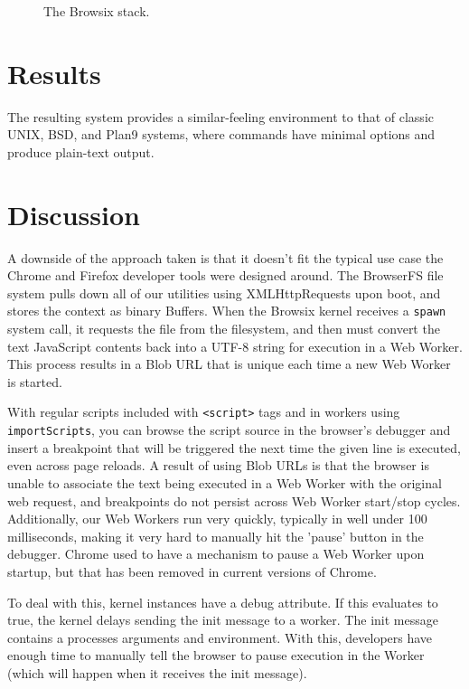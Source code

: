 \documentclass{acm_proc_article-sp}
\begin{document}
\begin{figure}
\centering
{}
\caption{The Browsix stack.}
\end{figure}

\section{Results}

The resulting system provides a similar-feeling environment to that of
classic UNIX, BSD, and Plan9 systems, where commands have minimal
options and produce plain-text output.

\section{Discussion}

A downside of the approach taken is that it doesn't fit the typical
use case the Chrome and Firefox developer tools were designed around.
The BrowserFS file system pulls down all of our utilities using
XMLHttpRequests upon boot, and stores the context as binary Buffers.
When the Browsix kernel receives a \texttt{spawn} system call, it
requests the file from the filesystem, and then must convert the text
JavaScript contents back into a UTF-8 string for execution in a Web
Worker.  This process results in a Blob URL that is unique each time a
new Web Worker is started.

With regular scripts included with \texttt{<script>} tags and in
workers using \texttt{importScripts}, you can browse the script source
in the browser's debugger and insert a breakpoint that will be
triggered the next time the given line is executed, even across page
reloads.  A result of using Blob URLs is that the browser is unable to
associate the text being executed in a Web Worker with the original
web request, and breakpoints do not persist across Web Worker
start/stop cycles.  Additionally, our Web Workers run very quickly,
typically in well under 100 milliseconds, making it very hard to
manually hit the 'pause' button in the debugger.  Chrome used to have
a mechanism to pause a Web Worker upon startup, but that has been
removed in current versions of Chrome.

To deal with this, kernel instances have a debug attribute.  If this
evaluates to true, the kernel delays sending the init message to a
worker.  The init message contains a processes arguments and
environment.  With this, developers have enough time to manually tell
the browser to pause execution in the Worker (which will happen when
it receives the init message).
\end{document}
